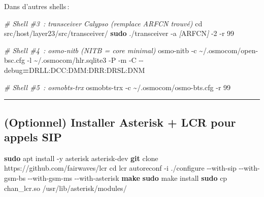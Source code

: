 \documentclass[
  french,
]{article}
\newenvironment{Shaded}{\begin{snugshade}}{\end{snugshade}}
\newcommand{\AttributeTok}[1]{\textcolor[rgb]{0.13,0.29,0.53}{#1}}
\newcommand{\BuiltInTok}[1]{#1}
\newcommand{\CommentTok}[1]{\textcolor[rgb]{0.56,0.35,0.01}{\textit{#1}}}
\newcommand{\ExtensionTok}[1]{#1}
\newcommand{\FunctionTok}[1]{\textcolor[rgb]{0.13,0.29,0.53}{\textbf{#1}}}
\newcommand{\NormalTok}[1]{#1}
\newcommand{\OperatorTok}[1]{\textcolor[rgb]{0.81,0.36,0.00}{\textbf{#1}}}
\newcommand{\PreprocessorTok}[1]{\textcolor[rgb]{0.56,0.35,0.01}{\textit{#1}}}
\newcommand{\SpecialStringTok}[1]{\textcolor[rgb]{0.31,0.60,0.02}{#1}}
\begin{document}
Dans d'autres shells\,:

\begin{Shaded}
\begin{Highlighting}[]
\CommentTok{\# Shell \#3 : transceiver Calypso (remplace ARFCN trouvé)}
\BuiltInTok{cd}\NormalTok{ src/host/layer23/src/transceiver/}
\FunctionTok{sudo}\NormalTok{ ./transceiver }\AttributeTok{{-}a} \PreprocessorTok{[}\SpecialStringTok{ARFCN}\PreprocessorTok{]} \AttributeTok{{-}2} \AttributeTok{{-}r}\NormalTok{ 99}

\CommentTok{\# Shell \#4 : osmo{-}nitb (NITB = core minimal)}
\ExtensionTok{osmo{-}nitb} \AttributeTok{{-}c}\NormalTok{ \textasciitilde{}/.osmocom/open{-}bsc.cfg }\AttributeTok{{-}l}\NormalTok{ \textasciitilde{}/.osmocom/hlr.sqlite3 }\AttributeTok{{-}P} \AttributeTok{{-}m} \AttributeTok{{-}C} \AttributeTok{{-}{-}debug}\OperatorTok{=}\NormalTok{DRLL:DCC:DMM:DRR:DRSL:DNM}

\CommentTok{\# Shell \#5 : osmobts{-}trx}
\ExtensionTok{osmobts{-}trx} \AttributeTok{{-}c}\NormalTok{ \textasciitilde{}/.osmocom/osmo{-}bts.cfg }\AttributeTok{{-}r}\NormalTok{ 99}
\end{Highlighting}
\end{Shaded}

\begin{center}\rule{0.5\linewidth}{0.5pt}\end{center}

\subsection{(Optionnel) Installer Asterisk + LCR pour appels
SIP}\label{optionnel-installer-asterisk-lcr-pour-appels-sip}

\begin{Shaded}
\begin{Highlighting}[]
\FunctionTok{sudo}\NormalTok{ apt install }\AttributeTok{{-}y}\NormalTok{ asterisk asterisk{-}dev}
\FunctionTok{git}\NormalTok{ clone https://github.com/fairwaves/lcr}
\BuiltInTok{cd}\NormalTok{ lcr}
\ExtensionTok{autoreconf} \AttributeTok{{-}i}
\ExtensionTok{./configure} \AttributeTok{{-}{-}with{-}sip} \AttributeTok{{-}{-}with{-}gsm{-}bs} \AttributeTok{{-}{-}with{-}gsm{-}ms} \AttributeTok{{-}{-}with{-}asterisk}
\FunctionTok{make}
\FunctionTok{sudo}\NormalTok{ make install}
\FunctionTok{sudo}\NormalTok{ cp chan\_lcr.so /usr/lib/asterisk/modules/}
\end{Highlighting}
\end{Shaded}
\end{document}
